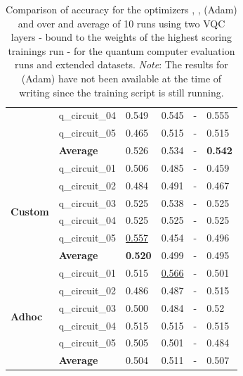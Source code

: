 \begin{table}[!h]
{\begin{tabular}{p{}p{}|p{}p{}p{}p{}}
    		                        & q\_circuit\_04 & 0.549  & 0.545 & -   & 0.555 \\
    		                        & q\_circuit\_05 & 0.465  & 0.515 & -   & 0.515 \\
    		\cline{2-6} 
    		                        & \textbf{Average} & 0.526  & 0.534 & -   & \textbf{0.542} \\
    		\hline
    		\multirow{6}{*}{\textbf{Custom}} & q\_circuit\_01 & 0.506  & 0.485 & -   & 0.459 \\
    		                        & q\_circuit\_02 & 0.484  & 0.491 & -   & 0.467 \\
    		                        & q\_circuit\_03 & 0.525  & 0.538 & -   & 0.525 \\
    		                        & q\_circuit\_04 & 0.525  & 0.525 & -  & 0.525 \\
    		                        & q\_circuit\_05 & \underline{0.557}  & 0.454 & -   & 0.496 \\
    		\cline{2-6} 
    		                        & \textbf{Average} & \textbf{0.520} & 0.499 & -   & 0.495 \\
    		\hline 
    		\multirow{6}{*}{\textbf{Adhoc}}  & q\_circuit\_01 & 0.515  & \underline{0.566} & -   & 0.501 \\
    		                        & q\_circuit\_02 & 0.486  & 0.487 & -   & 0.515 \\
    		                        & q\_circuit\_03 & 0.500  & 0.484 & -   & 0.52 \\
    		                        & q\_circuit\_04 & 0.515 & 0.515 & -   & 0.515 \\
    		                        & q\_circuit\_05 & 0.505 & 0.501 & -   & 0.484 \\
    		\cline{2-6} 
    		                        & \textbf{Average} & 0.504  & 0.511 & -  & 0.507 \\
    		\hline 
    	\end{tabular}
	}
	\caption{Comparison of accuracy for the optimizers , ,  (Adam) and  over and average of 10 runs using two VQC layers - bound to the weights of the highest scoring trainings run - for the quantum computer evaluation runs and extended datasets. \textit{Note}: The results for  (Adam) have not been available at the time of writing since the training script is still running.}
	\label{table:accuracy_comparison_extended_dataset_and_optimizers_evaluation_runs}
\end{table}

